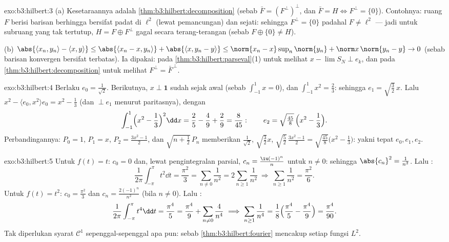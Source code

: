 \begin{solution}{exo:b3:hilbert:3}
(a) Kesetaraannya adalah \cref{thm:b3:hilbert:decomposition}
(sebab $\bar F = (F^\perp)^\perp$, dan $\bar F = H \iff F^\perp =
\{0\}$). Contohnya: ruang $F$ berisi barisan berhingga bersifat padat
di $\ell^2$ (lewat pemancungan) dan sejati: sehingga $F^\perp = \{0\}$ padahal $F
\neq \ell^2$ --- jadi untuk subruang yang tak tertutup, $H = F \oplus
F^\perp$ gagal secara terang-terangan (sebab $F \oplus \{0\} \neq H$).

(b) $\abs{\langle x_n, y_n\rangle - \langle x, y\rangle} \leq
\abs{\langle x_n - x, y_n\rangle} + \abs{\langle x, y_n -
y\rangle} \leq \norm{x_n - x}\sup_n\norm{y_n} + \norm
x\,\norm{y_n - y} \to 0$ (sebab barisan konvergen bersifat terbatas).
Ia dipakai: pada \cref{thm:b3:hilbert:parseval}(1) untuk melihat $x - \lim
S_N \perp e_k$, dan pada \cref{thm:b3:hilbert:decomposition}
untuk melihat $F^\perp = \bar F^{\,\perp}$.
\end{solution}

\begin{solution}{exo:b3:hilbert:4}
Berlaku $e_0 = \frac1{\sqrt2}$. Berikutnya, $x \perp \mathbf 1$ sudah sejak awal
(sebab $\int_{-1}^1x = 0$), dan $\int_{-1}^1x^2 = \frac23$: sehingga $e_1 =
\sqrt{\tfrac32}\,x$. Lalu $x^2 - \langle e_0, x^2\rangle e_0 =
x^2 - \frac13$ (dan $\perp e_1$ menurut paritasnya), dengan
\[
\int_{-1}^1\Bigl(x^2 - \frac13\Bigr)^2\dd x = \frac25 -
\frac49 + \frac29 = \frac{8}{45}:
\qquad e_2 = \sqrt{\tfrac{45}8}\,\Bigl(x^2 - \frac13\Bigr).
\]
Perbandingannya: $P_0 = 1$, $P_1 = x$, $P_2 = \frac{3x^2 - 1}2$, dan
$\sqrt{n + \tfrac12}\,P_n$ memberikan $\frac1{\sqrt2}$,
$\sqrt{\frac32}x$, $\sqrt{\frac52}\,\frac{3x^2-1}2 =
\sqrt{\frac{45}8}\bigl(x^2 - \frac13\bigr)$: yakni tepat $e_0, e_1,
e_2$.
\end{solution}

\begin{solution}{exo:b3:hilbert:5}
Untuk $f(t) = t$: $c_0 = 0$ dan, lewat pengintegralan parsial, $c_n =
\frac{\iu(-1)^n}{n}$ untuk $n \neq 0$: sehingga $\abs{c_n}^2 =
\frac1{n^2}$. Lalu :
\[
\frac1{2\pi}\int_{-\pi}^\pi t^2\dd t = \frac{\pi^2}3
= \sum_{n\neq0}\frac1{n^2} = 2\sum_{n\geq1}\frac1{n^2}
\ \Longrightarrow\ \sum_{n\geq1}\frac1{n^2} = \frac{\pi^2}6 .
\]
Untuk $f(t) = t^2$: $c_0 = \frac{\pi^2}3$ dan $c_n =
\frac{2(-1)^n}{n^2}$ (bila $n \ne 0$). Lalu :
\[
\frac1{2\pi}\int_{-\pi}^{\pi}t^4\dd t = \frac{\pi^4}5
= \frac{\pi^4}9 + \sum_{n\neq0}\frac4{n^4}
\ \Longrightarrow\
\sum_{n\geq1}\frac1{n^4} = \frac18\Bigl(\frac{\pi^4}5 -
\frac{\pi^4}9\Bigr) = \frac{\pi^4}{90} .
\]
Tak diperlukan syarat $\mathcal C^1$ sepenggal-sepenggal apa pun:
sebab \cref{thm:b3:hilbert:fourier} mencakup setiap fungsi $L^2$.
\end{solution}

